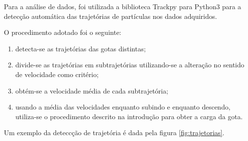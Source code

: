 \documentclass[twoside, twocolumn]{article}
\begin{document}
Para a análise de dados, foi utilizada a biblioteca Trackpy para Python3 para a detecção automática das trajetórias de partículas nos dados adquiridos.

O procedimento adotado foi o seguinte:

\begin{enumerate}
  \item detecta-se as trajetórias das gotas distintas;
  \item divide-se as trajetórias em subtrajetórias utilizando-se a alteração no sentido de velocidade como critério;
  \item obtém-se a velocidade média de cada subtrajetória;
  \item usando a média das velocidades enquanto subindo e enquanto descendo, utiliza-se o procedimento descrito na introdução para obter a carga da gota.
\end{enumerate}

Um exemplo da deteccção de trajetória é dada pela figura \ref{fig:trajetorias}.
\end{document}
